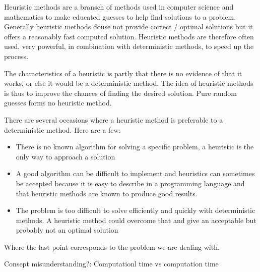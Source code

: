 Heuristic methods are a bransch of methods used in computer science and mathematics to make educated guesses to help find solutions to a problem. Generally heuristic methods douse not provide correct / optimal solutions but it offers a reasonably fast computed solution. Heuristic methods are therefore often used, very powerful, in combination with deterministic methods, to speed up the process.

The characteristics of a heuristic is partly that there is no evidence of that it works, or else it would be a deterministic method. The idea of heuristic methods is thus to improve the chances of finding the desired solution. Pure random guesses forms no heuristic method.

There are several occasions where a heuristic method is preferable to a deterministic method.
Here are a few:

\begin{itemize}
\item There is no known algorithm for solving a specific problem, a heuristic is the only way to approach a solution
\item A good algorithm can be difficult to implement and heuristics can sometimes be accepted because it is easy to describe in a programming language and that heuristic methods are known to produce good results.
\item The problem is too difficult to solve efficiently and quickly with deterministic methods. A heuristic method could overcome that and give an acceptable but probably not an optimal solution
\end{itemize}

Where the last point corresponds to the problem we are dealing with.

Consept misunderstanding?:
Computationl time vs computation time

